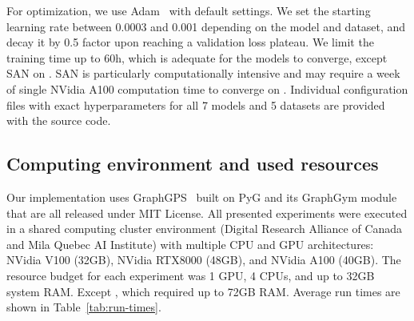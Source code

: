 \documentclass{article}
\begin{document}
For optimization, we use Adam~\cite{kingma2017adam} with default settings. We set the starting learning rate between 0.0003 and 0.001 depending on the model and dataset, and decay it by 0.5 factor upon reaching a validation loss plateau. We limit the training time up to 60h, which is adequate for the models to converge, except SAN on \coco. SAN is particularly computationally intensive and may require a week of single NVidia A100 computation time to converge on \coco. Individual configuration files with exact hyperparameters for all 7 models and 5 datasets are provided with the source code.


\subsection{Computing environment and used resources}\label{app:cluster}
Our implementation uses GraphGPS~\cite{rampasek2022GPS} built on PyG and its GraphGym module \cite{FeyLenssen2019PyG,you2020design} that are all released under MIT License. All presented experiments were executed in a shared computing cluster environment (Digital Research Alliance of Canada and Mila Quebec AI Institute) with multiple CPU and GPU architectures: NVidia V100 (32GB), NVidia RTX8000 (48GB), and NVidia A100 (40GB). The resource budget for each experiment was 1 GPU, 4 CPUs, and up to 32GB system RAM. Except \coco, which required up to 72GB RAM. Average run times are shown in Table~\ref{tab:run-times}.


\begin{table}[ht]
\caption{Wall-clock run times. Average epoch time (average of 5 epochs, including validation performance evaluation) is shown for each model and dataset combination. Additionally, the precomputation time needed for LapPE and RWSE statistics is listed in the bottom of the table. The times were measured on a single NVidia A100 GPU system with 4 CPU cores of AMD Milan 7413.}\label{tab:run-times}
\end{table}
\end{document}
